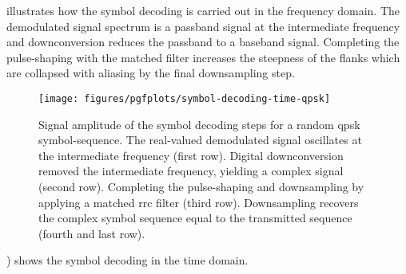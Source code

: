  illustrates how the symbol decoding is carried out in the frequency domain.
The demodulated signal spectrum is a passband signal at the intermediate frequency and downconversion reduces the passband to a baseband signal.
Completing the pulse-shaping with the matched filter increases the steepness of the flanks which are collapsed with aliasing by the final downsampling step.
\begin{figure}[htb]
	\centering
	\texttt{[image: figures/pgfplots/symbol-decoding-time-qpsk]}
	\caption{Signal amplitude of the symbol decoding steps for a random \gls{qpsk} symbol-sequence. The real-valued demodulated signal oscillates at the intermediate frequency (first row). Digital downconversion removed the intermediate frequency, yielding a complex signal (second row). Completing the pulse-shaping and downsampling by applying a matched \gls{rrc} filter (third row). Downsampling recovers the complex symbol sequence equal to the transmitted sequence (fourth and last row).}\label{fig:symbol_decoding_time}
\end{figure}
) shows the symbol decoding in the time domain.
